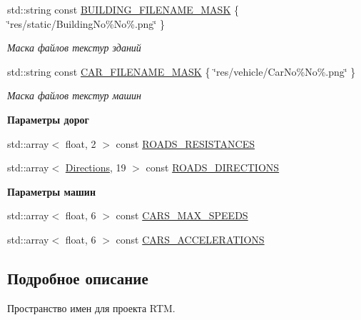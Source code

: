 \begin{Indent}
\begin{DoxyCompactItemize}
std\+::string const \hyperlink{namespacertm_a7a49fe0b8d4f52458bfc22145e46faf5}{B\+U\+I\+L\+D\+I\+N\+G\+\_\+\+F\+I\+L\+E\+N\+A\+M\+E\+\_\+\+M\+A\+SK} \{ \char`\"{}res/static/Building\+No\%No\%.png\char`\"{} \}
\begin{DoxyCompactList}\small\item\em Маска файлов текстур зданий \end{DoxyCompactList}\item 
\mbox{\label{namespacertm_a72fea838addb841a6ea0173857a8eff1}} 
std\+::string const \hyperlink{namespacertm_a72fea838addb841a6ea0173857a8eff1}{C\+A\+R\+\_\+\+F\+I\+L\+E\+N\+A\+M\+E\+\_\+\+M\+A\+SK} \{ \char`\"{}res/vehicle/Car\+No\%No\%.png\char`\"{} \}
\begin{DoxyCompactList}\small\item\em Маска файлов текстур машин \end{DoxyCompactList}\end{DoxyCompactItemize}
\end{Indent}
\begin{Indent}\textbf{ Параметры дорог}\par
\begin{DoxyCompactItemize}
\item 
std\+::array$<$ float, 2 $>$ const \hyperlink{namespacertm_a9f4d245ca5d201a5853914c175d0d17f}{R\+O\+A\+D\+S\+\_\+\+R\+E\+S\+I\+S\+T\+A\+N\+C\+ES}
\item 
std\+::array$<$ \hyperlink{namespacertm_a4776fbfe59834ff1a16838ad6735b69a}{Directions}, 19 $>$ const \hyperlink{namespacertm_a7416fccc43126173ec6456c78f5474f9}{R\+O\+A\+D\+S\+\_\+\+D\+I\+R\+E\+C\+T\+I\+O\+NS}
\end{DoxyCompactItemize}
\end{Indent}
\begin{Indent}\textbf{ Параметры машин}\par
\begin{DoxyCompactItemize}
\item 
std\+::array$<$ float, 6 $>$ const \hyperlink{namespacertm_ab4d4feaa707f2d1eba41feae3b46451f}{C\+A\+R\+S\+\_\+\+M\+A\+X\+\_\+\+S\+P\+E\+E\+DS}
\item 
std\+::array$<$ float, 6 $>$ const \hyperlink{namespacertm_acac83b872b644793530e7f6f4660c85e}{C\+A\+R\+S\+\_\+\+A\+C\+C\+E\+L\+E\+R\+A\+T\+I\+O\+NS}
\end{DoxyCompactItemize}
\end{Indent}


\subsection{Подробное описание}
Пространство имен для проекта R\+TM. 

